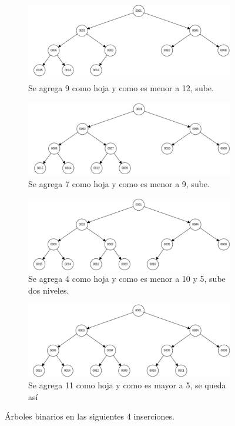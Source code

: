 \documentclass[12pt]{article}
\begin{document}
\begin{figure}
	\begin{subfigure}{.7\textwidth}
		\centering
		\includegraphics[width=1.1\linewidth]{hp010}
		\caption{Se agrega 9 como hoja y como es menor a 12, sube.}
		\label{fig:sfig10}
	\end{subfigure}
\begin{subfigure}{.7\textwidth}
	\centering
	\includegraphics[width=1.1\linewidth]{hp011}
	\caption{Se agrega 7 como hoja y como es menor a 9, sube.}
	\label{fig:sfig11}
\end{subfigure}
\begin{subfigure}{.7\textwidth}
	\centering
	\includegraphics[width=1.1\linewidth]{hp012}
	\caption{Se agrega 4 como hoja y como es menor a 10 y 5, sube dos niveles.}
	\label{fig:sfig12}
\end{subfigure}
\begin{subfigure}{.7\textwidth}
	\centering
	\includegraphics[width=1.1\linewidth]{hp013}
	\caption{Se agrega 11 como hoja y como es mayor a 5, se queda así}
	\label{fig:sfig13}
\end{subfigure}
	\caption{Árboles binarios en las siguientes 4 inserciones.}
	\label{fig:fig_}
\end{figure}
\end{document}
